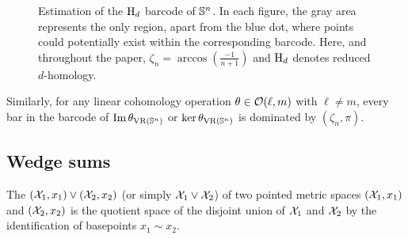 
\begin{figure}[ht]
	\centering
	
	\caption{Estimation of the $\mathrm{H}_d$ barcode of $\mathbb{S}^n$.
		In each figure, the gray area represents the only region, apart from the blue dot, where points could potentially exist within the corresponding barcode.
		Here, and throughout the paper, $\zeta_n = \arccos(\tfrac{-1}{n+1})$ and $\mathrm{H}_d$ denotes reduced $d$-homology.}
	\label{fig:Sk}
\end{figure}

Similarly, for any linear cohomology operation $\theta \in \mathcal{O}(\ell,m)$ with $\ell \neq m$, every bar in the barcode of $\operatorname{Im}\theta_{\operatorname{VR}(\mathbb{S}^n)}$ or $\ker\theta_{\operatorname{VR}(\mathbb{S}^n)}$ is dominated by $(\zeta_n,\pi)$.


\subsection{Wedge sums}

The  $(\mathcal{X}_1, x_1) \vee (\mathcal{X}_2, x_2)$ (or simply $\mathcal{X}_1 \vee \mathcal{X}_2$) of two pointed metric spaces $(\mathcal{X}_1, x_1)$ and $(\mathcal{X}_2, x_2)$ is the quotient space of the disjoint union of $\mathcal{X}_1$ and $\mathcal{X}_2$ by the identification of basepoints $x_1 \sim x_2$.


